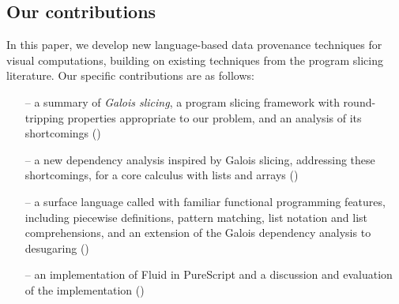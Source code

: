\subsection{Our contributions}

In this paper, we develop new language-based data provenance techniques for visual computations, building on existing techniques from the program slicing literature. Our specific contributions are as follows:

\begin{itemize}
   \item[--] a summary of \emph{Galois slicing}, a program slicing framework with round-tripping properties appropriate to our problem, and an analysis of its shortcomings ()
   \item[--] a new dependency analysis inspired by Galois slicing, addressing these shortcomings, for a core calculus with lists and arrays ()
   \item[--] a surface language called \OurLanguage with familiar functional programming features, including piecewise definitions, pattern matching, list notation and list comprehensions, and an extension of the Galois dependency analysis to desugaring ()
   \item[--] an implementation of Fluid in PureScript and a discussion and evaluation of the implementation ()
\end{itemize}
